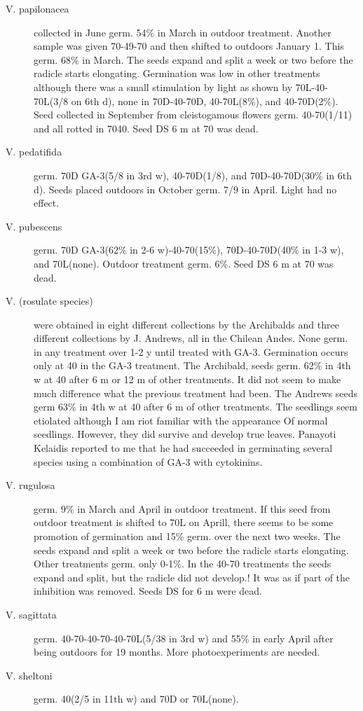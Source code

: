\begin{description}
\item[V. papilonacea] collected in June germ. 54\% in March in outdoor treatment.
Another sample was given 70-49-70 and then shifted to outdoors January 1. This
germ. 68\% in March. The seeds expand and split a week or two before the radicle
starts elongating. Germination was low in other treatments although there was a small
stimulation by light as shown by 70L-40-70L(3/8 on 6th d), none in 70D-40-70D,
40-70L(8\%), and 40-70D(2\%). Seed collected in September from cleistogamous
flowers germ. 40-70(1/11) and all rotted in 7040. Seed DS 6 m at 70 was dead.
\item[V. pedatifida] germ. 70D GA-3(5/8 in 3rd w), 40-70D(1/8), and 70D-40-70D(30\%
in 6th d). Seeds placed outdoors in October germ. 7/9 in April. Light had no effect.
\item[V. pubescens] germ. 70D GA-3(62\% in 2-6 w)-40-70(15\%), 70D-40-70D(40\% in
1-3 w), and 70L(none). Outdoor treatment germ. 6\%. Seed DS 6 m at 70 was dead.
\item[V. (rosulate species)] were obtained in eight different collections by the
Archibalds and three different collections by J. Andrews, all in the Chilean Andes.
None germ. in any treatment over 1-2 y until treated with GA-3. Germination occurs
only at 40 in the GA-3 treatment. The Archibald, seeds germ. 62\% in 4th w at 40 after 6
m or 12 m of other treatments. It did not seem to make much difference what the
previous treatment had been. The Andrews seeds germ 63\% in 4th w at 40 after 6 m
of other treatments. The seedlings seem etiolated although I am riot familiar with the
appearance Of normal seedlings. However, they did survive and develop true leaves.
Panayoti Kelaidis reported to me that he had succeeded in germinating several
species using a combination of GA-3 with cytokinins.
\item[V. rugulosa] germ. 9\% in March and April in outdoor treatment. If this seed from
outdoor treatment is shifted to 70L on Aprill, there seems to be some promotion of
germination and 15\% germ. over the next two weeks. The seeds expand and split a
week or two before the radicle starts elongating. Other treatments germ. only 0-1\%. In
the 40-70 treatments the seeds expand and split, but the radicle did not develop.! It
was as if part of the inhibition was removed. Seeds DS for 6 m were dead.
\item[V. sagittata] germ. 40-70-40-70-40-70L(5/38 in 3rd w) and 55\% in early April
after being outdoors for 19 months. More photoexperiments are needed.
\item[V. sheltoni] germ. 40(2/5 in 11th w) and 70D or 70L(none).

\end{description}
